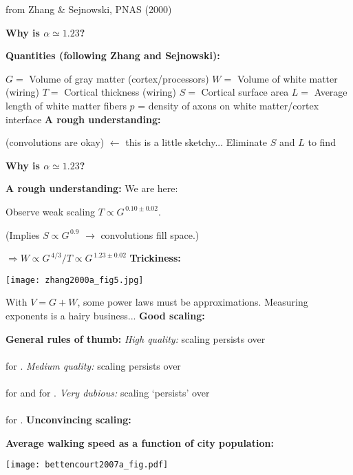 \small from Zhang \& Sejnowski, PNAS (2000)\cite{zhang2000a}

\textbf{Why is $\alpha \simeq 1.23$?}

\textbf{Quantities (following Zhang and Sejnowski):}

$G = $ Volume of gray matter (cortex/processors)
$W = $ Volume of white matter (wiring)
$T = $ Cortical thickness (wiring)
$S = $ Cortical surface area
$L = $ Average length of white matter fibers
$p$ = density of axons on white matter/cortex interface
\textbf{A rough understanding:}

 (convolutions are okay)
 {$\leftarrow$ this is a little sketchy...}
Eliminate $S$ and $L$ to find 

\textbf{Why is $\alpha \simeq 1.23$?}

\textbf{A rough understanding:}
We are here: 

Observe weak scaling $T \propto G^{\, 0.10 \pm 0.02}$.

(Implies $S \propto G^{\, 0.9}$ $\rightarrow$ convolutions fill space.)

$\Rightarrow W \propto G^{\, 4/3}/T \propto G^{\, 1.23 \pm 0.02}$
\textbf{Trickiness:}

\begin{marginfigure}[]
  \texttt{[image: zhang2000a\_fig5.jpg]}
\end{marginfigure}




With $V = G + W$, some power laws must be approximations.
Measuring exponents is a hairy business...
\textbf{Good scaling:}

\textbf{General rules of thumb:}
\textit{High quality:} scaling persists over\\
\\
for .
\textit{Medium quality:} scaling persists over \\
\\
for  and 
 for .
\textit{Very dubious:} scaling `persists' over\\
\\
for .
\textbf{Unconvincing scaling:}

\textbf{Average walking speed as a function of city population:}
\begin{marginfigure}[]
  \texttt{[image: bettencourt2007a\_fig.pdf]}
\end{marginfigure}


